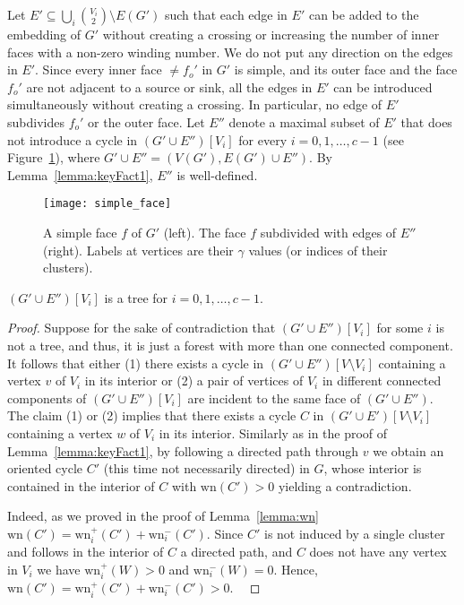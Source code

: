 \documentclass{llncs}
\def\qed{ \ \vrule width.2cm height.2cm depth0cm\smallskip}
\def\wn{\mathrm{wn}}
\begin{document}
Let $E'\subseteq \bigcup_i{V_i \choose 2}\setminus E(G')$ such that each edge in $E'$ can be added to 
the embedding of $G'$ without creating a crossing or increasing the number of inner faces with a non-zero winding number.
We do not put any direction on the edges in $E'$.
Since every inner face $\not=f_o'$ in $G'$ is simple, and its outer face and the face $f_o'$ are not adjacent
to a source or sink, all the edges in $E'$ can be 
introduced simultaneously without creating a crossing. 
In particular, no edge of $E'$ subdivides $f_o'$ or the outer face.
Let $E''$ denote a maximal subset of $E'$
that does not introduce a cycle in $(G'\cup E'')[V_i]$ for every $i=0,1,\ldots, c-1$ (see Figure~\ref{fig:simpleFace}), where $G' \cup E'' = (V(G'), E(G') \cup E'')$.
By Lemma~\ref{lemma:keyFact1}, $E''$ is well-defined.


\begin{figure}\centering
\texttt{[image: simple\_face]}
\caption{A simple face $f$ of $G'$ (left). The face $f$ subdivided with edges of $E''$ (right). Labels at vertices are their $\gamma$ values (or indices of their clusters).}
\label{fig:simpleFace}
\end{figure}





\begin{lemma}
\label{lemma:keyFact2}
  $(G'\cup E'')[V_i]$  is a tree for $i=0,1,\ldots, c-1$.
  \end{lemma}
\begin{proof}
Suppose for the sake of contradiction that $(G'\cup E'')[V_i]$ for some $i$ is not a tree, and thus, it is just a  forest with more than one connected component.
It follows that either (1) there exists a cycle in $(G'\cup E'')[V\setminus V_i ]$
containing a vertex $v$ of $V_i$ in its interior
or (2) a pair of vertices of $V_i$ in different
connected components of $(G'\cup E'')[V_i]$  are incident to the same face of $(G'\cup E'')$.  
The claim (1) or (2) implies that there exists a cycle
$C$ in $(G'\cup E')[V\setminus V_i]$ containing a vertex $w$ of $V_i$ in its interior.
Similarly as in the proof of Lemma~\ref{lemma:keyFact1}, by following
a directed path through $v$ we obtain 
an oriented cycle $C'$ (this time not necessarily directed) in $G$,  whose interior is contained in the interior of $C$ with $\wn(C')>0$ yielding a contradiction.

Indeed, as we proved in  the proof of Lemma~\ref{lemma:wn} 
$\wn(C') = \wn_i^+(C') + \wn_i^-(C')$.
Since $C'$ is not induced by a single cluster and follows in the interior of $C$ a directed path, and $C$ does not have any vertex in $V_i$ we have
 $\wn_i^+(W)>0$ and $\wn_i^-(W)=0$.
Hence, $\wn(C') = \wn_i^+(C') + \wn_i^-(C')>0$. 
\qed\end{proof}
\end{document}
